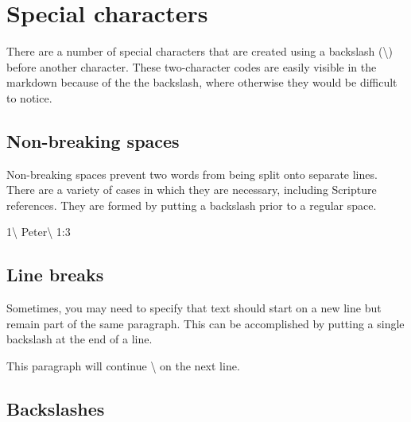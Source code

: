 \documentclass[
]{book}
\newenvironment{Shaded}{\begin{snugshade}}{\end{snugshade}}
\newcommand{\NormalTok}[1]{#1}
\begin{document}
\hypertarget{special-characters}{%
\chapter{Special characters}\label{special-characters}}

There are a number of special characters that are created using a backslash (\textbackslash) before another character. These two-character codes are easily visible in the markdown because of the the backslash, where otherwise they would be difficult to notice.

\hypertarget{non-breaking-spaces}{%
\section{Non-breaking spaces}\label{non-breaking-spaces}}

Non-breaking spaces prevent two words from being split onto separate lines. There are a variety of cases in which they are necessary, including Scripture references. They are formed by putting a backslash prior to a regular space.

\begin{Shaded}
\begin{Highlighting}[]
\NormalTok{1\textbackslash{} Peter\textbackslash{} 1:3 }
\end{Highlighting}
\end{Shaded}

\hypertarget{line-breaks}{%
\section{Line breaks}\label{line-breaks}}

Sometimes, you may need to specify that text should start on a new line but remain part of the same paragraph. This can be accomplished by putting a single backslash at the end of a line.

\begin{Shaded}
\begin{Highlighting}[]
\NormalTok{This paragraph will continue \textbackslash{}}
\NormalTok{on the next line.}
\end{Highlighting}
\end{Shaded}

\hypertarget{backslashes}{%
\section{Backslashes}\label{backslashes}}
\end{document}

